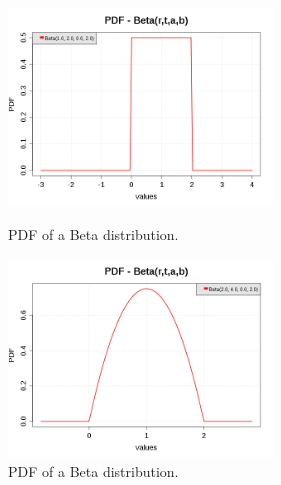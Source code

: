 \begin{figure}[H]
  \begin{minipage}{10cm}
    \begin{center}
      \includegraphics[width=7cm]{pdf_Beta_2.png}
      \caption{PDF of a Beta distribution.}
      \label{PDFBeta2}
    \end{center}
  \end{minipage}
  \hfill
  \begin{minipage}{10cm}
    \begin{center}
      \includegraphics[width=7cm]{pdf_Beta_3.png}
      \caption{PDF of a Beta distribution.}
      \label{PDFBeta3}
    \end{center}
  \end{minipage}
\end{figure}

